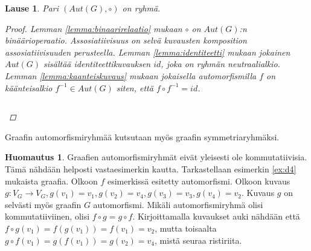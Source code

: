 \documentclass[a4paper, 12pt]{article}
\theoremstyle{definition}
\newtheorem{huom}{Huomautus}
\theoremstyle{plain}
\newtheorem{teor}[mydef]{Lause}
\begin{document}
\begin{teor}
Pari $(Aut(G), \circ)$ on ryhmä.
\begin{proof}
Lemman \ref{lemma:binaarirelaatio} mukaan $\circ$ on $Aut(G)$:n binäärioperaatio. Assosiatiivisuus on selvä kuvausten komposition assosiatiivisuuden perusteella. Lemman \ref{lemma:identiteetti} mukaan jokainen $Aut(G)$ sisältää identiteettikuvauksen $id$, joka on ryhmän neutraalialkio. Lemman \ref{lemma:kaanteiskuvaus} mukaan jokaisella automorfismilla $f$ on käänteisalkio $f^{-1} \in Aut(G)$ siten, että $f \circ f^{-1} = id$.
\begin{center}
\begin{math}
\end{math}
\end{center}
\end{proof}
\end{teor}

Graafin automorfismiryhmää kutsutaan myös graafin symmetriaryhmäksi.

\begin{huom}
Graafien automorfismiryhmät eivät yleisesti ole kommutatiivisia.\\
Tämä nähdään helposti vastaesimerkin kautta. Tarkastellaan esimerkin \ref{ex:d4} mukaista graafia. Olkoon $f$ esimerkissä esitetty automorfismi. Olkoon kuvaus $g: V_G \rightarrow V_G, g(v_1) = v_1, g(v_2) = v_4, g(v_3) = v_3, g(v_4) = v_2$. Kuvaus $g$ on selvästi myös graafin $G$ automorfismi. Mikäli automorfismiryhmä olisi kommutatiiviinen, olisi $f \circ g = g \circ f$. Kirjoittamalla kuvaukset auki nähdään että $f \circ g(v_1) = f(g(v_1)) = f(v_1) = v_2$, mutta toisaalta $g \circ f (v_1) = g(f(v_1)) = g(v_2) = v_4$, mistä seuraa ristiriita.
\end{huom}
\end{document}

